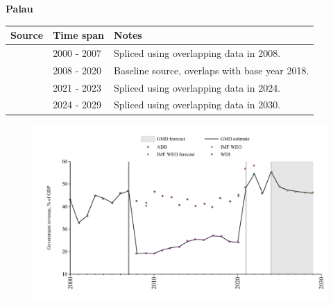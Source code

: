 \documentclass[12pt,a4paper,landscape]{article}
\begin{document}
\begin{adjustbox}{max totalsize={\paperwidth}{\paperheight},center}
\begin{minipage}[t][\textheight][t]{\textwidth}
\vspace*{0.5cm}
{}
\begin{center}
{\Large\bfseries Palau}
\end{center}
\vspace{0.5cm}
\begin{table}[H]
\centering
\small
\begin{tabular}{|l|l|l|}
\hline
\textbf{Source} & \textbf{Time span} & \textbf{Notes} \\
\hline
\rowcolor{white}\cite{ADB}& 2000 - 2007 &Spliced using overlapping data in 2008.\\
\rowcolor{lightgray}\cite{WDI}& 2008 - 2020 &Baseline source, overlaps with base year 2018.\\
\rowcolor{white}\cite{ADB}& 2021 - 2023 &Spliced using overlapping data in 2024.\\
\rowcolor{lightgray}\cite{IMF_WEO_forecast}& 2024 - 2029 &Spliced using overlapping data in 2030.\\
\hline
\end{tabular}
\end{table}
\begin{figure}[H]
\centering
\includegraphics[width=\textwidth,height=0.6\textheight,keepaspectratio]{graphs/PLW_govrev_GDP.pdf}
\end{figure}
\end{minipage}
\end{adjustbox}
\end{document}
